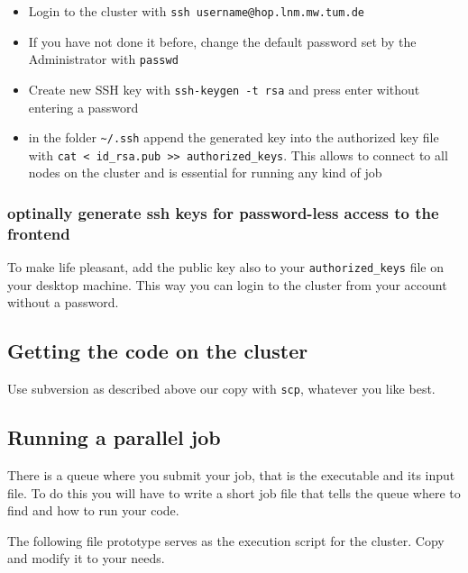 \begin{itemize}
\item Login to the cluster with \texttt{ssh username@hop.lnm.mw.tum.de}
\item If you have not done it before, change the default password set by
the Administrator with \texttt{passwd }
\item Create new SSH key with \texttt{ssh-keygen -t rsa} and press enter
without entering a password
\item in the folder \texttt{\textasciitilde{}/.ssh} append the generated key
into the authorized key file with \texttt{cat < id\_rsa.pub >> authorized\_keys}.
This allows to connect to all nodes on the cluster and is essential
for running any kind of job
\end{itemize}

\subsubsection{optinally generate ssh keys for password-less access to the frontend }

To make life pleasant, add the public key also to your \texttt{authorized\_keys}
file on your desktop machine. This way you can login to the cluster
from your account without a password.


\subsection{Getting the code on the cluster}

Use subversion as described above our copy with \texttt{scp}, whatever
you like best.


\subsection{Running a parallel job}

There is a queue where you submit your job, that is the executable
and its input file. To do this you will have to write a short job
file that tells the queue where to find and how to run your code.

The following file prototype serves as the execution script for the
cluster. Copy and modify it to your needs.

